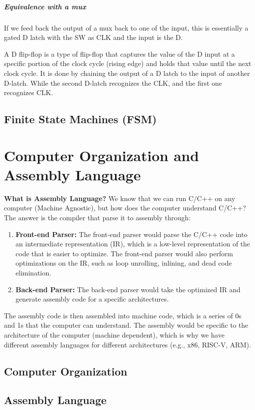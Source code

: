 \documentclass[11pt]{report}
\begin{document}
\paragraph{Equivalence with a mux} If we feed back the output of a mux back to one of the input, this is essentially a gated D latch with the SW as CLK and the input is the D.

\begin{definition}
    A D flip-flop is a type of flip-flop that captures the value of the D input at a specific portion of the clock cycle (rising edge) and holds that value until the next clock cycle. It is done by chaining the output of a D latch to the input of another D-latch. While the second D-latch recognizes the CLK, and the first one recognizes $\overline{\text{CLK}}$.
\end{definition}
\section{Finite State Machines (FSM)}

\chapter{Computer Organization and Assembly Language}
\begin{shaded}
\textbf{What is Assembly Language?} We know that we can run C/C++ on any computer (Machine Agnostic), but how does the computer understand C/C++? The answer is the compiler that parse it to assembly through:

\begin{enumerate}
    \item \textbf{Front-end Parser:} The front-end parser would parse the C/C++ code into an intermediate representation (IR), which is a low-level representation of the code that is easier to optimize. The front-end parser would also perform optimizations on the IR, such as loop unrolling, inlining, and dead code elimination.
    \item \textbf{Back-end Parser:} The back-end parser would take the optimized IR and generate assembly code for a specific architectures.
\end{enumerate}
\end{shaded}
The assembly code is then assembled into machine code, which is a series of 0s and 1s that the computer can understand. The assembly would be specific to the architecture of the computer (machine dependent), which is why we have different assembly languages for different architectures (e.g., x86, RISC-V, ARM).
\section{Computer Organization}
\section{Assembly Language}
\end{document}
